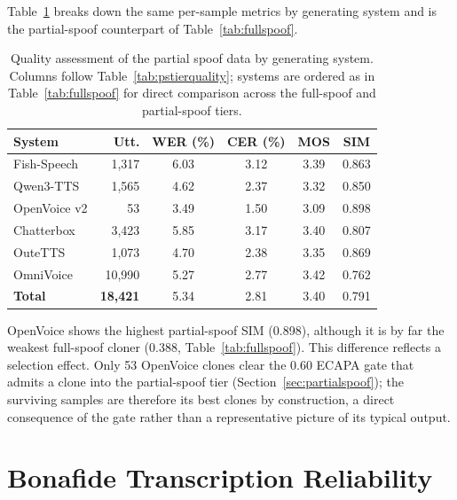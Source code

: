 \documentclass[11pt]{report}
\begin{document}
Table~\ref{tab:pssystemquality} breaks down the same
per-sample metrics by generating system and is the partial-spoof
counterpart of Table~\ref{tab:fullspoof}.

\begin{table}[H]
\centering
\caption{Quality assessment of the partial spoof data by generating
system. Columns follow Table~\ref{tab:pstierquality}; systems are
ordered as in Table~\ref{tab:fullspoof} for direct comparison across
the full-spoof and partial-spoof tiers.}
\label{tab:pssystemquality}
\small
\begin{tabular}{lrcccc}
\toprule
\textbf{System} & \textbf{Utt.} & \textbf{WER (\%)} & \textbf{CER (\%)} & \textbf{MOS} & \textbf{SIM} \\
\midrule
Fish-Speech & 1{,}317  & 6.03 & 3.12 & 3.39 & 0.863 \\
Qwen3-TTS               & 1{,}565  & 4.62 & 2.37 & 3.32 & 0.850 \\
OpenVoice v2            &    53   & 3.49 & 1.50 & 3.09 & 0.898 \\
Chatterbox              & 3{,}423  & 5.85 & 3.17 & 3.40 & 0.807 \\
OuteTTS                 & 1{,}073  & 4.70 & 2.38 & 3.35 & 0.869 \\
OmniVoice               & 10{,}990 & 5.27 & 2.77 & 3.42 & 0.762 \\
\midrule
\textbf{Total}          & \textbf{18{,}421} & 5.34 & 2.81 & 3.40 & 0.791 \\
\bottomrule
\end{tabular}
\end{table}

OpenVoice shows the highest partial-spoof SIM (0.898),
although it is by far the weakest full-spoof cloner (0.388,
Table~\ref{tab:fullspoof}). This difference reflects a selection effect.
Only 53 OpenVoice clones clear the 0.60 ECAPA gate that admits a clone
into the partial-spoof tier (Section~\ref{sec:partialspoof}); the
surviving samples are therefore its best clones by construction, a
direct consequence of the gate rather than a representative picture of
its typical output.

\section{Bonafide Transcription Reliability}
\end{document}
